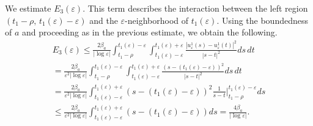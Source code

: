 \documentclass[12pt]{article}
\numberwithin{equation}{section}
\begin{document}
We estimate $ E_{3}(\varepsilon)$. This term describes the interaction between the left region $(t_1-\rho,\, t_1(\varepsilon)-\varepsilon)$ and the $\varepsilon$-neighborhood of $t_1(\varepsilon)$. Using the boundedness of $a$ and proceeding as in the previous estimate, we obtain the following.
\begin{multline*}
    E_{3}(\varepsilon)\leq
    \frac{2\beta_{a}}{|\log\varepsilon|}\int_{t_{1}-\rho}^{t_{1}(\varepsilon)-\varepsilon}\int_{t_{1}(\varepsilon)-\varepsilon}^{t_{1}(\varepsilon)+\varepsilon}\frac{\left|u^{1}_{\varepsilon}(s)-u^{1}_{\varepsilon}(t)\right|^2}{\left|s-t\right|^2}ds\,dt\\=\frac{2\beta_{a}}{\varepsilon^2|\log\varepsilon|}\int_{t_{1}-\rho}^{t_{1}(\varepsilon)-\varepsilon}\int_{t_{1}(\varepsilon)-\varepsilon}^{t_{1}(\varepsilon)+\varepsilon}\frac{\left(s-(t_{1}(\varepsilon)-\varepsilon)\right)^2}{\left|s-t\right|^2}ds\,dt\\=\frac{2\beta_{a}}{\varepsilon^2|\log\varepsilon|}\int_{t_{1}(\varepsilon)-\varepsilon}^{t_{1}(\varepsilon)+\varepsilon}\left(s-(t_{1}(\varepsilon)-\varepsilon)\right)^2\frac{1}{s-t}\Big|_{t_{1}-\rho}^{t_{1}(\varepsilon)-\varepsilon}ds\\\leq\frac{2\beta_{a}}{\varepsilon^2|\log\varepsilon|}\int_{t_{1}(\varepsilon)-\varepsilon}^{t_{1}(\varepsilon)+\varepsilon}\left(s-(t_{1}(\varepsilon)-\varepsilon)\right)ds=\frac{4\beta_{a}}{|\log\varepsilon|}.
\end{multline*}
\end{document}
